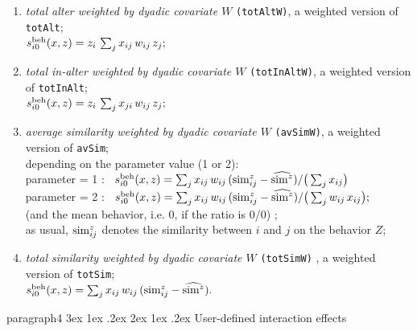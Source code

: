 \documentclass[a4paper,fleqn,11pt]{article}
\makeatletter
\renewcommand\paragraph{\@startsection
   {paragraph}{4}{\z@}               %
   {3ex \@plus1ex \@minus.2ex}       %
   {2ex \@plus1ex \@minus.2ex}       %
   {\normalfont\normalsize\bfseries\itshape}}   %
\newcommand{\+}{\, + \,}
\newcommand{\vit}{\theenumi}
\newcounter{savenumi}
\makeatother
\begin{document}
\begin{enumerate}
 \item {\em total alter weighted by dyadic covariate $W$}
                       \texttt{(totAltW)},
                       a weighted version of  \texttt{totAlt};\\
   $s^{\rm beh}_{i\vit}(x, z) =  z_i \, \sum_j x_{ij} \, w_{ij} \, z_j  ;$

 \item {\em total in-alter weighted by dyadic covariate $W$}
                       \texttt{(totInAltW)},
                       a weighted version of  \texttt{totInAlt};\\
   $s^{\rm beh}_{i\vit}(x, z) =  z_i \, \sum_j x_{ji} \, w_{ij} \, z_j  ;$

 \item {\em average similarity weighted by dyadic covariate $W$}
                       \texttt{(avSimW)},
                       a weighted version of  \texttt{avSim};\\
                       depending on the parameter value (1 or 2):\\
  parameter = 1 : \ $s^{\rm beh}_{i\vit}(x, z) =
                      \sum_j x_{ij} \, w_{ij} \,({\rm sim}^z_{ij} - \widehat{{\rm sim}^z})  /
                                        \big (\sum_j x_{ij}\big)$\\
   parameter = 2 : \  $s^{\rm beh}_{i\vit}(x, z) =
                  \sum_j x_{ij} \, w_{ij} \,({\rm sim}^z_{ij} - \widehat{{\rm sim}^z}) /
                                \big (\sum_j w_{ij} \,x_{ij}\big) ;$\\
 (and the mean behavior, i.e. $0$, if the ratio is 0/0) ;\\
   as usual, ${\rm sim}^z_{ij}$ denotes the similarity between $i$ and $j$
   on the behavior $Z$;
 \item {\em total similarity weighted by dyadic covariate $W$}
                       \texttt{(totSimW)} ,
                       a weighted version of  \texttt{totSim}; \\
   $s^{\rm beh}_{i\vit}(x, z) = \sum_j x_{ij} \, w_{ij} \, ({\rm sim}^z_{ij} - \widehat{{\rm sim}^z})  .$
\setcounter{savenumi}{\value{enumi}}
\end{enumerate}



\paragraph{User-defined interaction effects}
\end{document}
